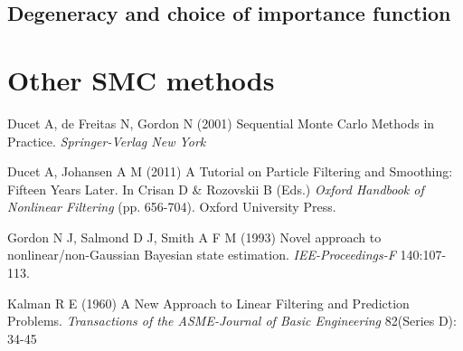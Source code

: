 \documentclass[11pt,a4paper]{article}
\begin{document}
\subsection{Degeneracy and choice of importance function}

\section{Other SMC methods}




\begin{thebibliography}{99}

 Ducet A, de Freitas N, Gordon N (2001) Sequential Monte Carlo Methods in Practice. \textit{Springer-Verlag New York}

 Ducet A, Johansen A M (2011) A Tutorial on Particle Filtering and Smoothing: Fifteen Years Later. In Crisan D & Rozovskii B (Eds.) \textit{Oxford Handbook of Nonlinear Filtering} (pp. 656-704). Oxford University Press.

 Gordon N J, Salmond D J, Smith A F M (1993) Novel approach to nonlinear/non-Gaussian Bayesian state estimation. \textit{IEE-Proceedings-F} 140:107-113.

 Kalman R E (1960) A New Approach to Linear Filtering and Prediction Problems. \textit{Transactions of the ASME-Journal of Basic Engineering} 82(Series D): 34-45



\end{thebibliography}
\end{document}
